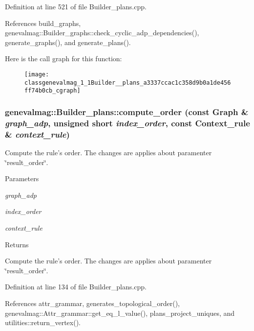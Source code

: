 Definition at line 521 of file Builder\_\-plans.cpp.



References build\_\-graphs, genevalmag::Builder\_\-graphs::check\_\-cyclic\_\-adp\_\-dependencies(), generate\_\-graphs(), and generate\_\-plans().



Here is the call graph for this function:\nopagebreak
\begin{figure}[H]
\begin{center}
\leavevmode
\texttt{[image: classgenevalmag\_1\_1Builder\_\_plans\_a3337ccac1c358d9b0a1de456ff74b0cb\_cgraph]}
\end{center}
\end{figure}


\hypertarget{classgenevalmag_1_1Builder__plans_a86e05ee91d27e62d16d77ecbdec05bf7}{
\subsubsection[{compute\_\-order}]{ genevalmag::Builder\_\-plans::compute\_\-order (const {\bf Graph} \& {\em graph\_\-adp}, \/  unsigned short {\em index\_\-order}, \/  const {\bf Context\_\-rule} \& {\em context\_\-rule})}}
\label{classgenevalmag_1_1Builder__plans_a86e05ee91d27e62d16d77ecbdec05bf7}
Compute the rule's order. The changes are applies about paramenter \char`\"{}result\_\-order\char`\"{}. 
\begin{DoxyParams}{Parameters}
\item[{\em graph\_\-adp}]\item[{\em index\_\-order}]\item[{\em context\_\-rule}]\end{DoxyParams}
\begin{DoxyReturn}{Returns}

\end{DoxyReturn}
Compute the rule's order. The changes are applies about paramenter \char`\"{}result\_\-order\char`\"{}. 

Definition at line 134 of file Builder\_\-plans.cpp.



References attr\_\-grammar, generates\_\-topological\_\-order(), genevalmag::Attr\_\-grammar::get\_\-eq\_\-l\_\-value(), plans\_\-project\_\-uniques, and utilities::return\_\-vertex().



